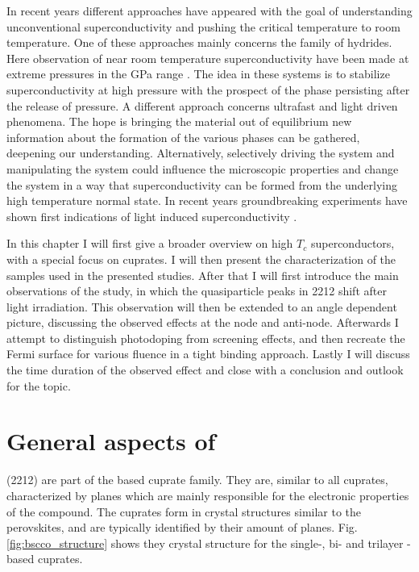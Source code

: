 In recent years different approaches have appeared with the goal of understanding unconventional superconductivity and pushing the critical temperature to room temperature.
One of these approaches mainly concerns the family of hydrides.
Here observation of near room temperature superconductivity have been made at extreme pressures in the \unit{\giga\pascal} range \cite{duan_structure_2017}.
The idea in these systems is to stabilize superconductivity at high pressure with the prospect of the phase persisting after the release of pressure.
A different approach concerns ultrafast and light driven phenomena.
The hope is bringing the material out of equilibrium new information about the formation of the various phases can be gathered, deepening our understanding.
Alternatively, selectively driving the system and manipulating the system could influence the microscopic properties and change the system in a way that superconductivity can be formed from the underlying high temperature normal state.
In recent years groundbreaking experiments have shown first indications of light induced superconductivity \cite{fausti_light-induced_2011,buzzi_phase_2021,fava_magnetic_2024}.

In this chapter I will first give a broader overview on high $T_c$ superconductors, with a special focus on cuprates.
I will then present the  characterization of the samples used in the presented studies.
After that I will first introduce the main observations of the study, in which the quasiparticle peaks in 2212 shift after light irradiation.
This observation will then be extended to an angle dependent picture, discussing the observed effects at the node and anti-node.
Afterwards I attempt to distinguish photodoping from screening effects, and then recreate the Fermi surface for various fluence in a tight binding approach.
Lastly I will discuss the time duration of the observed effect and close with a conclusion and outlook for the topic.

\section{General aspects of }
\label{sec:bscco_general}

 (2212) are part of the  based cuprate family.
They are, similar to all cuprates, characterized by  planes which are mainly responsible for the electronic properties of the compound.
The cuprates form in crystal structures similar to the perovskites, and are typically identified by their amount of  planes.
Fig. \ref{fig:bscco_structure} shows they crystal structure for the single-, bi- and trilayer -based cuprates.

